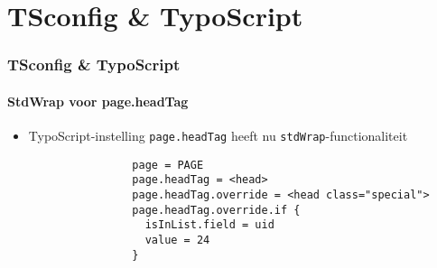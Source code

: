 %

\section{TSconfig \& TypoScript}


\begin{frame}[fragile]
	\frametitle{TSconfig \& TypoScript}
	\framesubtitle{StdWrap voor page.headTag}

	\begin{itemize}
		\item TypoScript-instelling \texttt{page.headTag} heeft nu \texttt{stdWrap}-functionaliteit

			\begin{lstlisting}
				page = PAGE
				page.headTag = <head>
				page.headTag.override = <head class="special">
				page.headTag.override.if {
		  		  isInList.field = uid
		  		  value = 24
				}
			\end{lstlisting}	

	\end{itemize}

\end{frame}


